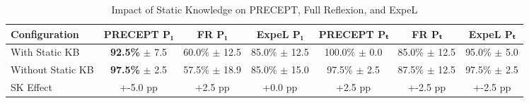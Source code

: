 \begin{table}[t]
\centering
\caption{Impact of Static Knowledge on PRECEPT, Full Reflexion, and ExpeL}
\label{tab:static_knowledge}
\begin{tabular}{lcccccc}
\toprule
Configuration & PRECEPT P₁ & FR P₁ & ExpeL P₁ & PRECEPT Pₜ & FR Pₜ & ExpeL Pₜ \\
\midrule
With Static KB & \textbf{92.5\%} $\pm$ 7.5 & 60.0\% $\pm$ 12.5 & 85.0\% $\pm$ 12.5 & 100.0\% $\pm$ 0.0 & 85.0\% $\pm$ 12.5 & 95.0\% $\pm$ 5.0 \\
Without Static KB & \textbf{97.5\%} $\pm$ 2.5 & 57.5\% $\pm$ 18.9 & 85.0\% $\pm$ 15.0 & 97.5\% $\pm$ 2.5 & 87.5\% $\pm$ 12.5 & 97.5\% $\pm$ 2.5 \\
\midrule
SK Effect & +-5.0 pp & +2.5 pp & +0.0 pp & +2.5 pp & +-2.5 pp & +-2.5 pp \\
\bottomrule
\end{tabular}
\end{table}
